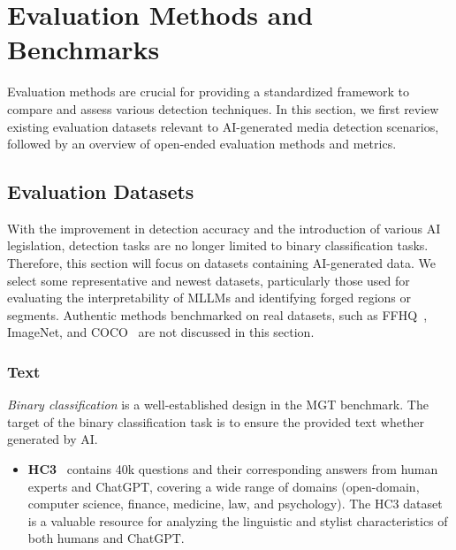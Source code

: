 

\section{Evaluation Methods and Benchmarks}
\label{sec:val}
Evaluation methods are crucial for providing a standardized framework to compare and assess various detection techniques. In this section, we first review existing evaluation datasets relevant to AI-generated media detection scenarios, followed by an overview of open-ended evaluation methods and metrics.

\subsection{Evaluation Datasets}
With the improvement in detection accuracy and the introduction of various AI legislation, detection tasks are no longer limited to binary classification tasks. Therefore, this section will focus on datasets containing AI-generated data. We select some representative and newest datasets, particularly those used for evaluating the interpretability of MLLMs and identifying forged regions or segments. Authentic methods benchmarked on real datasets, such as FFHQ~\cite{karras2019style}, ImageNet, and COCO~\cite{wu2023sepmark} are not discussed in this section.

\subsubsection{\textbf{Text}}
\textit{Binary classification} is a well-established design in the MGT benchmark. The target of the binary classification task is to ensure the provided text whether generated by AI. 
\begin{itemize}
    \item \textbf{HC3}~\cite{guo2023close} contains 40k questions and their corresponding answers from human experts and ChatGPT, covering a wide range of domains (open-domain, computer science, finance, medicine, law, and psychology). The HC3 dataset is a valuable resource for analyzing the linguistic and stylist characteristics of both humans and ChatGPT.
\end{itemize}


